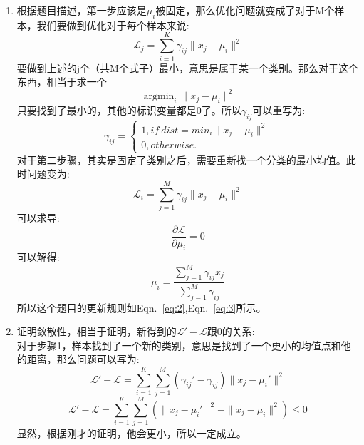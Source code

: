 \documentclass[answers]{exam}  %
\begin{document}
\begin{enumerate}[label=\alph*.]
    \item 根据题目描述，第一步应该是$\mu_i$被固定，那么优化问题就变成了对于M个样本，我们要做到优化对于每个样本来说:
    \begin{equation*}
        \mathcal{L}_j = \sum_{i=1}^{K} \gamma_{ij}\|x_j - \mu_i\|^2
    \end{equation*}
    要做到上述的j个（共M个式子）最小，意思是属于某一个类别。那么对于这个东西，相当于求一个
    \begin{equation*}
        \mathop{\arg\min}_{i} \|x_j - \mu_i\|^2
    \end{equation*}
    只要找到了最小的，其他的标识变量都是0了。所以$\gamma_{ij}$可以重写为:
    \begin{equation}
        \gamma_{ij} = 
        \begin{cases}
            1, if\ dist = min_i \|x_j - \mu_i\|^2\\
            0, otherwise.
        \end{cases}
    \end{equation}
    对于第二步骤，其实是固定了类别之后，需要重新找一个分类的最小均值。此时问题变为:
    \begin{equation*}
        \label{eq:2}
        \mathcal{L}_i = \sum_{j=1}^{M}  \gamma_{ij}\|x_j - \mu_i\|^2
    \end{equation*}
    可以求导:
    \begin{equation*}
        \frac{\partial \mathcal{L}}{\partial \mu_i} = 0
    \end{equation*}
    可以解得:
    \begin{equation}
        \label{eq:3}
        \mu_i = \frac{\sum_{j=1}^{M}\gamma_{ij}x_j}{\sum_{j=1}^{M}\gamma_{ij}}
    \end{equation}
    所以这个题目的更新规则如Eqn.~\ref{eq:2},Eqn.~\ref{eq:3}所示。
    \item 证明敛散性，相当于证明，新得到的$\mathcal{L}' - \mathcal{L}$跟0的关系:\\
    对于步骤1，样本找到了一个新的类别，意思是找到了一个更小的均值点和他的距离，那么问题可以写为:
    \begin{equation*}
        \mathcal{L}' - \mathcal{L} = \sum_{i=1}^{K}\sum_{j=1}^{M}(\gamma_{ij}' - \gamma_{ij})\|x_j-\mu_i'\|^2
    \end{equation*}
    \begin{equation*}
        \mathcal{L}' - \mathcal{L} = \sum_{i=1}^{K}\sum_{j=1}^{M}(\|x_j-\mu_i'\|^2 - \|x_j-\mu_i\|^2)\leq 0
    \end{equation*}
    显然，根据刚才的证明，他会更小，所以一定成立。\\

\end{enumerate}
\end{document}
